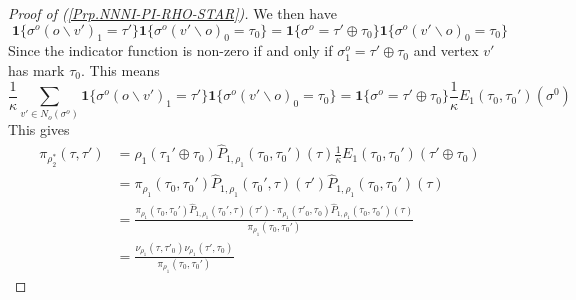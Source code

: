 \documentclass[12pt]{article}
\newcommand{\BS}{\backslash}
\newcommand{\one}[1]{\mathbf{1}\{#1\}}
\newcommand{\Ss}{{\rho_1}}
\newcommand{\Sm}{{\nu_{\Ss}}}
\newcommand{\Es}{{\pi_\Ss}}
\newcommand{\UE}{\widehat{P}_{1, \Ss}}
\numberwithin{equation}{section}
\begin{document}
\begin{proof}[Proof of (\ref{Prp.NNNI-PI-RHO-STAR})]
    We then have
    \begin{equation*}
        \one{\sigma^o(o\BS v')_1 = \tau'}\one{\sigma^o(v'\BS o)_0 = \tau_0} = \one{\sigma^o = \tau' \oplus \tau_0}\one{\sigma^o(v'\BS o)_0 = \tau_0}
    \end{equation*}
    Since the indicator function is non-zero if and only if $\sigma^o_1 = \tau' \oplus \tau_0$ and vertex $v'$ has mark $\tau_0$.
    This means
    \begin{equation*}
        \frac1\kappa \sum_{v'\in N_o(\sigma^o)}\one{\sigma^o(o\BS v')_1 = \tau'}\one{\sigma^o(v'\backslash o)_0 = \tau_0} = \one{\sigma^o = \tau' \oplus \tau_0}\frac1\kappa E_1(\tau_0, \tau_0')(\sigma^0)
    \end{equation*}
    This gives
    \begin{align*}
        \pi_{\rho_2^*}(\tau, \tau') & = \Ss(\tau_1' \oplus \tau_0)\UE(\tau_0, \tau_0')(\tau)\frac1\kappa E_1(\tau_0, \tau_0')(\tau' \oplus \tau_0)                    \\
                                    & = \Es(\tau_0, \tau_0')\UE(\tau_0', \tau)(\tau')\UE(\tau_0, \tau_0')(\tau)                                                       \\
                                    & = \frac{\Es(\tau_0, \tau_0')\UE(\tau_0', \tau)(\tau')\cdot\Es(\tau'_0, \tau_0)\UE(\tau_0, \tau_0')(\tau)}{\Es(\tau_0, \tau_0')} \\
                                    & = \frac{\Sm(\tau,\tau'_0)\Sm(\tau', \tau_0)}{\Es(\tau_0, \tau_0')}
    \end{align*}
\end{proof}

\newpage
\end{document}
